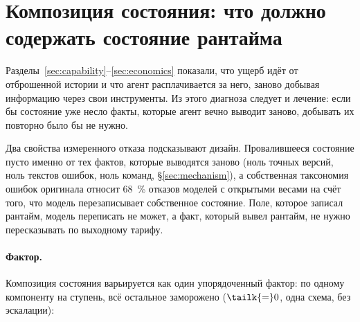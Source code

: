%
%

\section{Композиция состояния: что должно содержать состояние рантайма}
\label{sec:composition}

Разделы~\ref{sec:capability}--\ref{sec:economics} показали, что ущерб идёт
от отброшенной истории и что агент расплачивается за него, заново добывая
информацию через свои инструменты. Из этого диагноза следует и лечение:
если бы состояние уже несло факты, которые агент вечно выводит заново,
добывать их повторно было бы не нужно.

Два свойства измеренного отказа подсказывают дизайн. Провалившееся состояние
пусто именно от тех фактов, которые выводятся заново (ноль точных версий,
ноль текстов ошибок, ноль команд, \S\ref{sec:mechanism}), а собственная
таксономия ошибок оригинала относит \SI{68}{\percent} отказов моделей с
открытыми весами на счёт того, что модель перезаписывает собственное
состояние\origin. Поле, которое записал рантайм, модель переписать не может,
а факт, который вывел рантайм, не нужно пересказывать по выходному тарифу.

\paragraph{Фактор.} Композиция состояния варьируется как один упорядоченный
фактор: по одному компоненту на ступень, всё остальное заморожено
($\tailk{=}0$, одна схема, без эскалации):

